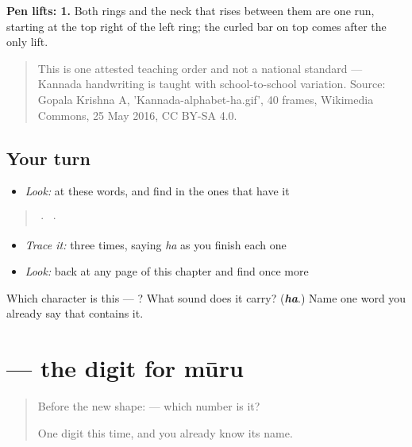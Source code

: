 \textbf{Pen lifts: 1.} Both rings and the neck that rises between them are one run, starting at the top right of the left ring; the curled bar on top comes after the only lift.

\begin{quote}
This is one attested teaching order and not a national standard — Kannada handwriting is taught with school-to-school variation. Source: Gopala Krishna A, 'Kannada-alphabet-ha.gif', 40 frames, Wikimedia Commons, 25 May 2016, CC BY-SA 4.0.
\end{quote}

\subsection*{Your turn}
\begin{itemize}
\raggedright
  \item \emph{Look:} at these words, and find  in the ones that have it
\end{itemize}

\begin{quote}
  ·    ·  
\end{quote}

\begin{itemize}
\raggedright
  \item \emph{Trace it:}  three times, saying \emph{ha} as you finish each one
  \item \emph{Look:} back at any page of this chapter and find  once more
\end{itemize}

\begin{tcolorbox}[breakable,colback=teal!4,colframe=teal!35!black,title={Before you move on}]
Which character is this — ? What sound does it carry? (\emph{\textbf{ha}}.) Name one word you already say that contains it.
\end{tcolorbox}
\section[\texorpdfstring{\kn{೩} (3)}{೩ (3)}]{ — the digit for mūru}

\label{lesson:KA-S142-digit-three}



\begin{quote}
Before the new shape: \textbf{} — which number is it?

One digit this time, and you already know its name.
\end{quote}

